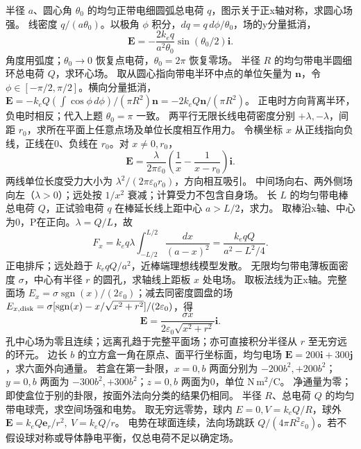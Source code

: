 \problemtext 半径 $a$、圆心角 $\theta_0$ 的均匀正带电细圆弧总电荷 $q$，图示关于正x轴对称，求圆心场强。
\workings 线密度 $q/(a\theta_0)$。以极角 $\phi$ 积分，$dq=q\,d\phi/\theta_0$，场的y分量抵消，
\[
\bm E=-\frac{2k_eq}{a^2\theta_0}\sin(\theta_0/2)\bm i.
\]
\crosscheck 角度用弧度；$\theta_0\to0$ 恢复点电荷，$\theta_0=2\pi$ 恢复零场。
\problemtext 半径 $R$ 的均匀带电半圆细环总电荷 $Q$，求环心场。
\workings 取从圆心指向带电半环中点的单位矢量为 $\bm n$，令 $\phi\in[-\pi/2,\pi/2]$。横向分量抵消，$\bm E=-k_e Q(\int\cos\phi\,d\phi)/(\pi R^2)\bm n=-2k_eQ\bm n/(\pi R^2)$。
\crosscheck 正电时方向背离半环，负电时相反；代入上题 $\theta_0=\pi$ 一致。
\problemtext 两平行无限长线电荷密度分别 $+\lambda,-\lambda$，间距 $r_0$，求所在平面上任意点场及单位长度相互作用力。
\workings 令横坐标 $x$ 从正线指向负线，正线在0、负线在 $r_0$。对 $x\ne0,r_0$，
\[
\bm E=\frac{\lambda}{2\pi\varepsilon_0}\left(\frac1x-\frac1{x-r_0}\right)\bm i.
\]
两线单位长度受力大小为 $\lambda^2/(2\pi\varepsilon_0r_0)$，方向相互吸引。
\crosscheck 中间场向右、两外侧场向左（$\lambda>0$）；远处按 $1/x^2$ 衰减；计算受力不包含自身场。
\problemtext 长 $L$ 的均匀带电棒总电荷 $Q$，正试验电荷 $q$ 在棒延长线上距中心 $a>L/2$，求力。
\workings 取棒沿x轴、中心为0，P在正向。$\lambda=Q/L$，故
\[
F_x=k_eq\lambda\int_{-L/2}^{L/2}\frac{dx}{(a-x)^2}
=\frac{k_eqQ}{a^2-L^2/4}.
\]
\crosscheck 正电排斥；远处趋于 $k_eqQ/a^2$，近棒端理想线模型发散。
\problemtext 无限均匀带电薄板面密度 $\sigma$，中心有半径 $r$ 的圆孔，求轴线上距板 $x$ 处电场。
\workings 取板法线为正x轴。完整面场 $E_x=\sigma\operatorname{sgn}(x)/(2\varepsilon_0)$；减去同密度圆盘的场 $E_{x,\rm disk}=\sigma[\operatorname{sgn}(x)-x/\sqrt{x^2+r^2}]/(2\varepsilon_0)$，得
\[
\bm E=\frac{\sigma x}{2\varepsilon_0\sqrt{x^2+r^2}}\bm i.
\]
\crosscheck 孔中心场为零且连续；远离孔趋于完整平面场；亦可直接积分半径从 $r$ 至无穷远的环元。
\problemtext 边长 $b$ 的立方盒一角在原点、面平行坐标面，均匀电场 $\bm E=200\bm i+300\bm j$，求六面外向通量。
\workings 若盒在第一卦限，$x=0,b$ 两面分别为 $-200b^2,+200b^2$；$y=0,b$ 两面为 $-300b^2,+300b^2$；$z=0,b$ 两面为0，单位 $\mathrm{N\,m^2/C}$。
\crosscheck 净通量为零；即使盒位于别的卦限，按面外法向分类的结果仍相同。
\problemtext 半径 $R$、总电荷 $Q$ 的均匀带电球壳，求空间场强和电势。
\workings 取无穷远零势，球内 $E=0,V=k_eQ/R$，球外 $\bm E=k_eQ\bm e_r/r^2,\ V=k_eQ/r$。
\crosscheck 电势在球面连续，法向场跳跃 $Q/(4\pi R^2\varepsilon_0)$。若不假设球对称或导体静电平衡，仅总电荷不足以确定场。
